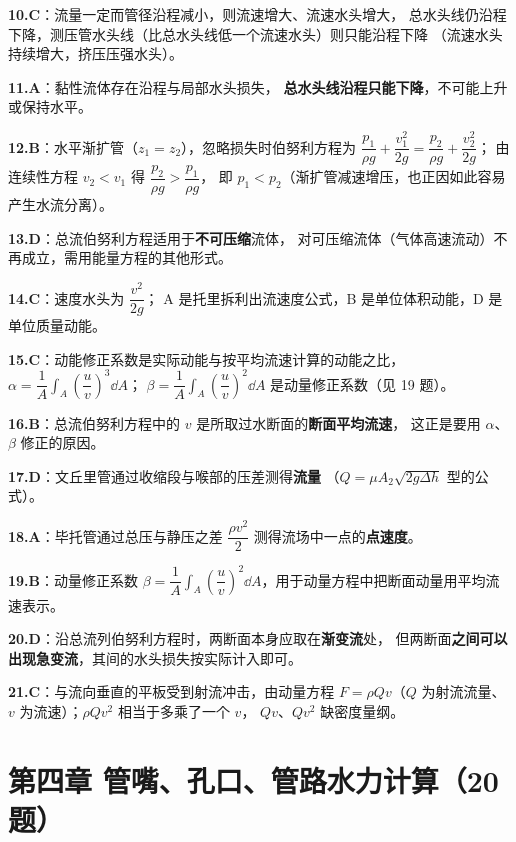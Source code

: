 \begin{tishi}
\begin{xiaowen}
\item \textbf{10.C}：流量一定而管径沿程减小，则流速增大、流速水头增大，
总水头线仍沿程下降，测压管水头线（比总水头线低一个流速水头）则只能沿程下降
（流速水头持续增大，挤压压强水头）。
\item \textbf{11.A}：黏性流体存在沿程与局部水头损失，
\textbf{总水头线沿程只能下降}，不可能上升或保持水平。
\item \textbf{12.B}：水平渐扩管（$z_1=z_2$），忽略损失时伯努利方程为
$\dfrac{p_1}{\rho g}+\dfrac{v_1^2}{2g}=\dfrac{p_2}{\rho g}+\dfrac{v_2^2}{2g}$；
由连续性方程 $v_2<v_1$ 得 $\dfrac{p_2}{\rho g}>\dfrac{p_1}{\rho g}$，
即 $p_1<p_2$（渐扩管减速增压，也正因如此容易产生水流分离）。
\item \textbf{13.D}：总流伯努利方程适用于\textbf{不可压缩}流体，
对可压缩流体（气体高速流动）不再成立，需用能量方程的其他形式。
\item \textbf{14.C}：速度水头为 $\dfrac{v^2}{2g}$；
A 是托里拆利出流速度公式，B 是单位体积动能，D 是单位质量动能。
\item \textbf{15.C}：动能修正系数是实际动能与按平均流速计算的动能之比，
$\alpha=\dfrac{1}{A}\displaystyle\int_A\left(\dfrac{u}{v}\right)^3\dd A$；
$\beta=\dfrac{1}{A}\displaystyle\int_A\left(\dfrac{u}{v}\right)^2\dd A$ 是动量修正系数（见 19 题）。
\item \textbf{16.B}：总流伯努利方程中的 $v$ 是所取过水断面的\textbf{断面平均流速}，
这正是要用 $\alpha$、$\beta$ 修正的原因。
\item \textbf{17.D}：文丘里管通过收缩段与喉部的压差测得\textbf{流量}
（$Q=\mu A_2\sqrt{2g\Delta h}$ 型的公式）。
\item \textbf{18.A}：毕托管通过总压与静压之差 $\dfrac{\rho v^2}{2}$
测得流场中一点的\textbf{点速度}。
\item \textbf{19.B}：动量修正系数 $\beta=\dfrac{1}{A}\displaystyle\int_A
\left(\dfrac{u}{v}\right)^2\dd A$，用于动量方程中把断面动量用平均流速表示。
\item \textbf{20.D}：沿总流列伯努利方程时，两断面本身应取在\textbf{渐变流}处，
但两断面\textbf{之间可以出现急变流}，其间的水头损失按实际计入即可。
\item \textbf{21.C}：与流向垂直的平板受到射流冲击，由动量方程
$F=\rho Qv$（$Q$ 为射流流量、$v$ 为流速）；$\rho Qv^2$ 相当于多乘了一个 $v$，
$Qv$、$Qv^2$ 缺密度量纲。
\end{xiaowen}
\end{tishi}

\section*{第四章 管嘴、孔口、管路水力计算（20 题）}

